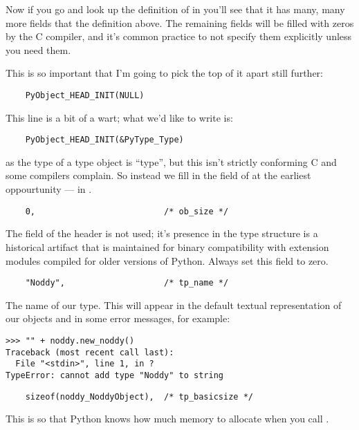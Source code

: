 Now if you go and look up the definition of  in
 you'll see that it has many, many more fields that the
definition above.  The remaining fields will be filled with zeros by
the C compiler, and it's common practice to not specify them
explicitly unless you need them.  

This is so important that I'm going to pick the top of it apart still
further:

\begin{verbatim}
    PyObject_HEAD_INIT(NULL)
\end{verbatim}

This line is a bit of a wart; what we'd like to write is:

\begin{verbatim}
    PyObject_HEAD_INIT(&PyType_Type)
\end{verbatim}

as the type of a type object is ``type'', but this isn't strictly
conforming C and some compilers complain.  So instead we fill in the
 field of  at the earliest
oppourtunity --- in .

\begin{verbatim}
    0,                          /* ob_size */
\end{verbatim}

The  field of the header is not used; it's presence in
the type structure is a historical artifact that is maintained for
binary compatibility with extension modules compiled for older
versions of Python.  Always set this field to zero.

\begin{verbatim}
    "Noddy",                    /* tp_name */
\end{verbatim}

The name of our type.  This will appear in the default textual
representation of our objects and in some error messages, for example:

\begin{verbatim}
>>> "" + noddy.new_noddy()
Traceback (most recent call last):
  File "<stdin>", line 1, in ?
TypeError: cannot add type "Noddy" to string
\end{verbatim}

\begin{verbatim}
    sizeof(noddy_NoddyObject),  /* tp_basicsize */
\end{verbatim}

This is so that Python knows how much memory to allocate when you call
.

